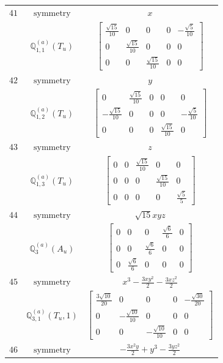 \documentclass[fleqn,8pt,landscape]{jsarticle}
\begin{document}
\begin{longtable}{ccc}
$ 41 $ & $ \text{symmetry} $ & $ x $ \\
$  $ & $ \mathbb{Q}_{1,1}^{(a)}(T_{u}) $ & $ \begin{bmatrix} \frac{\sqrt{15}}{10} & 0 & 0 & 0 & - \frac{\sqrt{5}}{10} \\ 0 & \frac{\sqrt{15}}{10} & 0 & 0 & 0 \\ 0 & 0 & \frac{\sqrt{15}}{10} & 0 & 0 \end{bmatrix} $ \\ \hline
$ 42 $ & $ \text{symmetry} $ & $ y $ \\
$  $ & $ \mathbb{Q}_{1,2}^{(a)}(T_{u}) $ & $ \begin{bmatrix} 0 & \frac{\sqrt{15}}{10} & 0 & 0 & 0 \\ - \frac{\sqrt{15}}{10} & 0 & 0 & 0 & - \frac{\sqrt{5}}{10} \\ 0 & 0 & 0 & \frac{\sqrt{15}}{10} & 0 \end{bmatrix} $ \\ \hline
$ 43 $ & $ \text{symmetry} $ & $ z $ \\
$  $ & $ \mathbb{Q}_{1,3}^{(a)}(T_{u}) $ & $ \begin{bmatrix} 0 & 0 & \frac{\sqrt{15}}{10} & 0 & 0 \\ 0 & 0 & 0 & \frac{\sqrt{15}}{10} & 0 \\ 0 & 0 & 0 & 0 & \frac{\sqrt{5}}{5} \end{bmatrix} $ \\ \hline
$ 44 $ & $ \text{symmetry} $ & $ \sqrt{15} x y z $ \\
$  $ & $ \mathbb{Q}_{3}^{(a)}(A_{u}) $ & $ \begin{bmatrix} 0 & 0 & 0 & \frac{\sqrt{6}}{6} & 0 \\ 0 & 0 & \frac{\sqrt{6}}{6} & 0 & 0 \\ 0 & \frac{\sqrt{6}}{6} & 0 & 0 & 0 \end{bmatrix} $ \\ \hline
$ 45 $ & $ \text{symmetry} $ & $ x^{3} - \frac{3 x y^{2}}{2} - \frac{3 x z^{2}}{2} $ \\
$  $ & $ \mathbb{Q}_{3,1}^{(a)}(T_{u},1) $ & $ \begin{bmatrix} \frac{3 \sqrt{10}}{20} & 0 & 0 & 0 & - \frac{\sqrt{30}}{20} \\ 0 & - \frac{\sqrt{10}}{10} & 0 & 0 & 0 \\ 0 & 0 & - \frac{\sqrt{10}}{10} & 0 & 0 \end{bmatrix} $ \\ \hline
$ 46 $ & $ \text{symmetry} $ & $ - \frac{3 x^{2} y}{2} + y^{3} - \frac{3 y z^{2}}{2} $ \\

\end{longtable}
\end{document}
